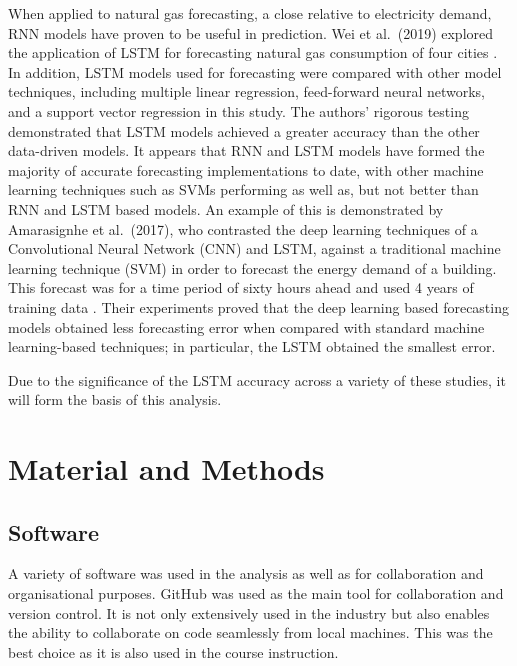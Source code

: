 \documentclass[mstat,12pt]{unswthesis}
\begin{document}
When applied to natural gas forecasting, a close relative to electricity
demand, RNN models have proven to be useful in prediction. Wei et
al.~(2019) explored the application of LSTM for forecasting natural gas
consumption of four cities \cite{Xue2020}. In addition, LSTM models used
for forecasting were compared with other model techniques, including
multiple linear regression, feed-forward neural networks, and a support
vector regression in this study. The authors' rigorous testing
demonstrated that LSTM models achieved a greater accuracy than the other
data-driven models. It appears that RNN and LSTM models have formed the
majority of accurate forecasting implementations to date, with other
machine learning techniques such as SVMs performing as well as, but not
better than RNN and LSTM based models. An example of this is
demonstrated by Amarasignhe et al.~(2017), who contrasted the deep
learning techniques of a Convolutional Neural Network (CNN) and LSTM,
against a traditional machine learning technique (SVM) in order to
forecast the energy demand of a building. This forecast was for a time
period of sixty hours ahead and used 4 years of training data
\cite{Amarasinghe2016}. Their experiments proved that the deep learning
based forecasting models obtained less forecasting error when compared
with standard machine learning-based techniques; in particular, the LSTM
obtained the smallest error.

\bigskip

Due to the significance of the LSTM accuracy across a variety of these
studies, it will form the basis of this analysis.

\hypertarget{material-and-methods}{%
\chapter{Material and Methods}\label{material-and-methods}}

\hypertarget{software}{%
\section{Software}\label{software}}

A variety of software was used in the analysis as well as for
collaboration and organisational purposes. GitHub was used as the main
tool for collaboration and version control. It is not only extensively
used in the industry but also enables the ability to collaborate on code
seamlessly from local machines. This was the best choice as it is also
used in the course instruction.
\end{document}
